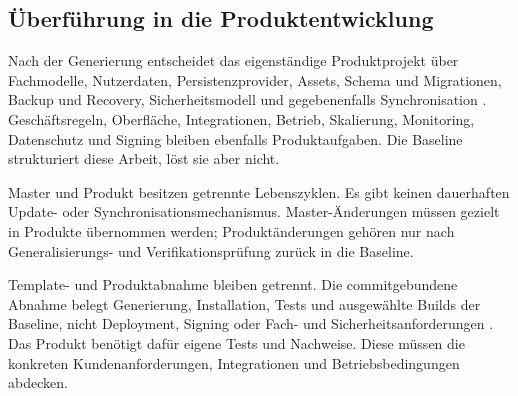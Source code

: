 \subsection{Überführung in die Produktentwicklung}
\label{subsec:ueberfuehrung-produktentwicklung}

Nach der Generierung entscheidet das eigenständige Produktprojekt über
Fachmodelle, Nutzerdaten, Persistenzprovider, Assets, Schema und Migrationen,
Backup und Recovery, Sicherheitsmodell und gegebenenfalls Synchronisation
\parencite{kleiveist2026persistence}. Geschäftsregeln, Oberfläche,
Integrationen, Betrieb, Skalierung, Monitoring, Datenschutz und Signing bleiben
ebenfalls Produktaufgaben. Die Baseline strukturiert diese Arbeit, löst sie
aber nicht.

Master und Produkt besitzen getrennte Lebenszyklen. Es gibt keinen dauerhaften
Update- oder Synchronisationsmechanismus. Master-Änderungen müssen gezielt in
Produkte übernommen werden; Produktänderungen gehören nur nach
Generalisierungs- und Verifikationsprüfung zurück in die Baseline.

Template- und Produktabnahme bleiben getrennt. Die commitgebundene Abnahme
belegt Generierung, Installation, Tests und ausgewählte Builds der Baseline,
nicht Deployment, Signing oder Fach- und Sicherheitsanforderungen
\parencite{kleiveist2026acceptance}. Das Produkt benötigt dafür eigene Tests
und Nachweise.
Diese müssen die konkreten Kundenanforderungen, Integrationen und
Betriebsbedingungen abdecken.
